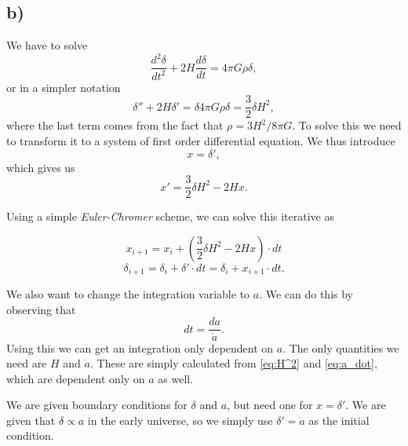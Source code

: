 \documentclass[a4paper,norsk, 10pt]{article}
\begin{document}
\subsection{b)}
We have to solve 
\begin{equation}
\frac{d^2 \delta}{dt^2} + 2H\frac{d\delta}{dt} = 4\pi G \rho \delta,
\end{equation}
or in a simpler notation
\begin{equation}
\delta '' + 2H \delta ' = \delta 4\pi G\rho \delta = \frac{3}{2}\delta H^2,
\end{equation}
where the last term comes from the fact that $\rho = 3H^2/8\pi G$. To solve this we need to transform it to a system of first order differential equation. We thus introduce
\begin{equation}
x = \delta',
\end{equation}
which gives us
\begin{equation}
x' = \frac{3}{2}\delta H^2 - 2Hx.
\end{equation}

Using a simple \textit{Euler-Chromer} scheme, we can solve this iterative as

\begin{equation}
x_{i+1} = x_{i} + \left(\frac{3}{2}\delta H^2 - 2Hx\right)\cdot dt
\end{equation}
\begin{equation}
\delta_{i+1} = \delta_{i} + \delta ' \cdot dt = \delta_{i} + x_{i+1} \cdot dt.
\end{equation}

We also want to change the integration variable to $a$. We can do this by observing that
\begin{equation}
dt = \frac{da}{\dot{a}}.
\end{equation}
Using this we can get an integration only dependent on $a$. The only quantities we need are $H$ and $\dot{a}$. These are simply calculated from \eqref{eq:H^2} and \eqref{eq:a_dot}, which are dependent only on $a$ as well.

We are given boundary conditions for $\delta$ and $a$, but need one for $x = \delta '$. We are given that $\delta \propto a$ in the early universe, so we simply use $\delta' = \dot{a}$ as the initial condition.
\end{document}
